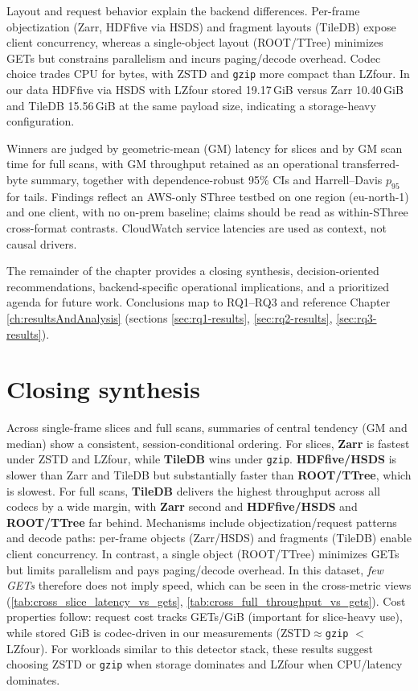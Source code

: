 \documentclass[nomenclature, english, bibtex]{kththesis}
\numberwithin{listing}{chapter}
\begin{document}
Layout and request behavior explain the backend differences. Per-frame objectization (Zarr, \gls{HDFfive} via \gls{HSDS}) and fragment layouts (TileDB) expose client concurrency, whereas a single-object layout (\gls{ROOT}/\gls{TTree}) minimizes GETs but constrains parallelism and incurs paging/decode overhead. Codec choice trades \gls{CPU} for bytes, with \gls{ZSTD} and \texttt{gzip} more compact than \gls{LZfour}. In our data \gls{HDFfive} via \gls{HSDS} with \gls{LZfour} stored 19.17\,GiB versus Zarr 10.40\,GiB and TileDB 15.56\,GiB at the same payload size, indicating a storage-heavy configuration.

Winners are judged by geometric-mean (\gls{GM}) latency for slices and by \gls{GM} scan time for full scans, with \gls{GM} throughput retained as an operational transferred-byte summary, together with dependence-robust 95\% \glspl{CI} and Harrell–Davis $p_{95}$ for tails. Findings reflect an \gls{AWS}-only \gls{SThree} testbed on one region (eu-north-1) and one client, with no on-prem baseline; claims should be read as within-\gls{SThree} cross-format contrasts. CloudWatch service latencies are used as context, not causal drivers.

The remainder of the chapter provides a closing synthesis, decision-oriented recommendations, backend-specific operational implications, and a prioritized agenda for future work. Conclusions map to RQ1–RQ3 and reference Chapter \ref{ch:resultsAndAnalysis} (sections \ref{sec:rq1-results}, \ref{sec:rq2-results}, \ref{sec:rq3-results}).

\section{Closing synthesis}
Across single-frame slices and full scans, summaries of central tendency (\gls{GM} and median) show a consistent, session-conditional ordering. For slices, \textbf{Zarr} is fastest under \gls{ZSTD} and \gls{LZfour}, while \textbf{TileDB} wins under \texttt{gzip}. \textbf{\gls{HDFfive}/\gls{HSDS}} is slower than Zarr and TileDB but substantially faster than \textbf{\gls{ROOT}/\gls{TTree}}, which is slowest. For full scans, \textbf{TileDB} delivers the highest throughput across all codecs by a wide margin, with \textbf{Zarr} second and \textbf{\gls{HDFfive}/\gls{HSDS}} and \textbf{\gls{ROOT}/\gls{TTree}} far behind. Mechanisms include objectization/request patterns and decode paths: per-frame objects (Zarr/\gls{HSDS}) and fragments (TileDB) enable client concurrency. In contrast, a single object (\gls{ROOT}/\gls{TTree}) minimizes GETs but limits parallelism and pays paging/decode overhead. In this dataset, \emph{few GETs} therefore does not imply speed, which can be seen in the cross-metric views (\ref{tab:cross_slice_latency_vs_gets}, \ref{tab:cross_full_throughput_vs_gets}). Cost properties follow: request cost tracks GETs/GiB (important for slice-heavy use), while stored GiB is codec-driven in our measurements (\gls{ZSTD}$\approx$\texttt{gzip} $<$ \gls{LZfour}). For workloads similar to this detector stack, these results suggest choosing \gls{ZSTD} or \texttt{gzip} when storage dominates and \gls{LZfour} when \gls{CPU}/latency dominates.
\end{document}
